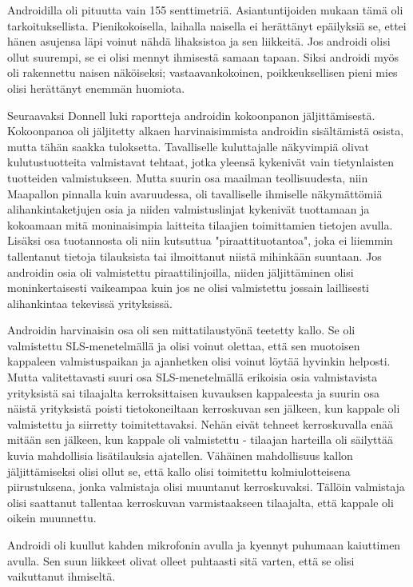Androidilla oli pituutta vain 155 senttimetriä. Asiantuntijoiden mukaan tämä oli tarkoituksellista. Pienikokoisella, laihalla naisella ei herättänyt epäilyksiä se, ettei hänen asujensa läpi voinut nähdä lihaksistoa ja sen liikkeitä. Jos androidi olisi ollut suurempi, se ei olisi mennyt ihmisestä samaan tapaan. Siksi androidi myös oli rakennettu naisen näköiseksi; vastaavankokoinen, poikkeuksellisen pieni mies olisi herättänyt enemmän huomiota.


Seuraavaksi Donnell luki raportteja androidin kokoonpanon jäljittämisestä. Kokoonpanoa oli jäljitetty alkaen harvinaisimmista androidin sisältämistä osista, mutta tähän saakka tuloksetta. Tavalliselle kuluttajalle näkyvimpiä olivat kulutustuotteita valmistavat tehtaat, jotka yleensä kykenivät vain tietynlaisten tuotteiden valmistukseen. Mutta suurin osa maailman teollisuudesta, niin Maapallon pinnalla kuin avaruudessa, oli tavalliselle ihmiselle näkymättömiä alihankintaketjujen osia ja niiden valmistuslinjat kykenivät tuottamaan ja kokoamaan mitä moninaisimpia laitteita tilaajien toimittamien tietojen avulla. Lisäksi osa tuotannosta oli niin kutsuttua "piraattituotantoa", joka ei liiemmin tallentanut tietoja tilauksista tai ilmoittanut niistä mihinkään suuntaan. Jos androidin osia oli valmistettu piraattilinjoilla, niiden jäljittäminen olisi moninkertaisesti vaikeampaa kuin jos ne olisi valmistettu jossain laillisesti alihankintaa tekevissä yrityksissä.


Androidin harvinaisin osa oli sen mittatilaustyönä teetetty kallo. Se oli valmistettu SLS-menetelmällä ja olisi voinut olettaa, että sen muotoisen kappaleen valmistuspaikan ja ajanhetken olisi voinut löytää hyvinkin helposti. Mutta valitettavasti suuri osa SLS-menetelmällä erikoisia osia valmistavista yrityksistä sai tilaajalta kerroksittaisen kuvauksen kappaleesta ja suurin osa näistä yrityksistä poisti tietokoneiltaan kerroskuvan sen jälkeen, kun kappale oli valmistettu ja siirretty toimitettavaksi. Nehän eivät tehneet kerroskuvalla enää mitään sen jälkeen, kun kappale oli valmistettu - tilaajan harteilla oli säilyttää kuvia mahdollisia lisätilauksia ajatellen. Vähäinen mahdollisuus kallon jäljittämiseksi olisi ollut se, että kallo olisi toimitettu kolmiulotteisena piirustuksena, jonka valmistaja olisi muuntanut kerroskuvaksi. Tällöin valmistaja olisi saattanut tallentaa kerroskuvan varmistaakseen tilaajalta, että kappale oli oikein muunnettu.


Androidi oli kuullut kahden mikrofonin avulla ja kyennyt puhumaan kaiuttimen avulla. Sen suun liikkeet olivat olleet puhtaasti sitä varten, että se olisi vaikuttanut ihmiseltä.



